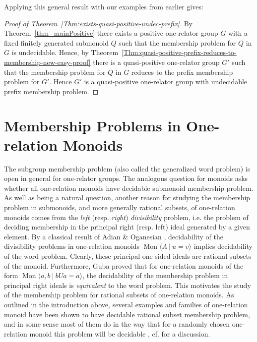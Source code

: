 \documentclass{amsart}
\newcommand{\Mpres}[2]{\operatorname{Mon}\bigl\langle #1\:|\:#2 \bigr\rangle}
\theoremstyle{plain}
\theoremstyle{definition}
\begin{document}
Applying this general result with our examples from earlier gives: 

\begin{proof}[Proof of Theorem~\ref{Thm:exists-quasi-positive-undec-prefix}] By Theorem~\ref{thm_mainPositive} there exists a positive one-relator group $G$ with a fixed finitely generated submonoid $Q$ such that the membership problem for $Q$ in $G$ is undecidable. Hence, by Theorem~\ref{Thm:quasi-positive-prefix-reduces-to-membership-new-easy-proof} there is a quasi-positive one-relator group $G'$ such that the membership problem for $Q$ in $G$ reduces to the prefix membership problem for $G'$. Hence $G'$ is a quasi-positive one-relator group with undecidable prefix membership problem. 
\end{proof}


\section{Membership Problems in One-relation Monoids}\label{Sec:SMMP-in-proper-one-relation-monoids}
The subgroup membership problem (also called the generalized word problem) is open in general for one-relator groups. The analogous question for monoids asks whether all one-relation monoids have decidable submonoid membership problem. As well as being a natural question, another reason for studying the membership problem in submonoids, and more generally rational subsets, of one-relation monoids comes from the \textit{left} (resp. \textit{right}) \textit{divisibility} problem, i.e. the problem of deciding membership in the principal right (resp. left) ideal generated by a given element.
By a classical result of Adian \& Oganesian \cite[Corollary~3]{Adian1978}, decidability of the divisibility problems in one-relation monoids $\Mpres{A}{u=v}$ implies decidability of the word problem. Clearly, these principal one-sided ideals are rational subsets of the monoid. Furthermore, Guba \cite{Guba1997} proved that for one-relation monoids of the form $\Mpres{a,b}{bUa=a}$, the decidability of the membership problem in principal right ideals is \textit{equivalent} to the word problem. This motivates the study of the membership problem for rational subsets of one-relation monoids. As outlined in the introduction above, several examples and families of one-relation monoid have been shown to have decidable rational subset membership problem, and in some sense most of them do in the way that for a randomly chosen one-relation monoid this problem will be decidable \cite{Kambites2009}, cf. \cite[p. 338]{NybergBrodda2021a} for a discussion.
\end{document}
